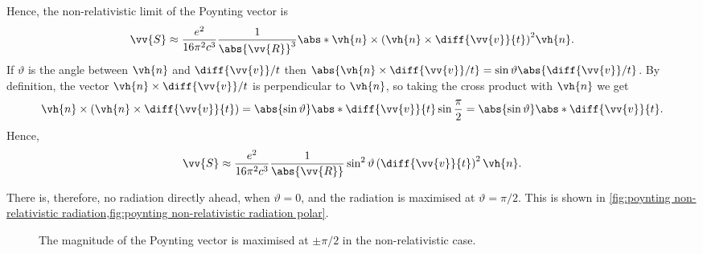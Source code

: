 \documentclass[fleqn]{NotesClass}
\begin{document}
    Hence, the non-relativistic limit of the Poynting vector is
    \begin{equation}
        \vv{S} \approx \frac{e^2}{16\pi^2c^3} \frac{1}{\abs{\vv{R}}^3} \abs*{\vh{n} \times \left( \vh{n} \times \diff{\vv{v}}{t} \right)}^2 \vh{n}.
    \end{equation}
    If \(\vartheta\) is the angle between \(\vh{n}\) and \(\diff{\vv{v}}/{t}\) then \(\abs{\vh{n} \times \diff{\vv{v}}/{t}} = \sin \vartheta \abs{\diff{\vv{v}}/{t}}\).
    By definition, the vector \(\vh{n} \times \diff{\vv{v}}/{t}\) is perpendicular to \(\vh{n}\), so taking the cross product with \(\vh{n}\) we get
    \begin{equation}
        \vh{n} \times \left( \vh{n} \times \diff{\vv{v}}{t} \right) = \abs{\sin\vartheta} \abs*{\diff{\vv{v}}{t}} \sin\frac{\pi}{2} = \abs{\sin\vartheta} \abs*{\diff{\vv{v}}{t}}.
    \end{equation}
    Hence,
    \begin{equation}
        \vv{S} \approx \frac{e^2}{16\pi^2 c^3} \frac{1}{\abs{\vv{R}}} \sin^2\vartheta \left( \diff{\vv{v}}{t} \right)^2 \vh{n}.
    \end{equation}
    
    There is, therefore, no radiation directly ahead, when \(\vartheta = 0\), and the radiation is maximised at \(\vartheta = \pi/2\).
    This is shown in \cref{fig:poynting non-relativistic radiation,fig:poynting non-relativistic radiation polar}.
    
    \begin{figure}
        \caption{The magnitude of the Poynting vector is maximised at \(\pm \pi/2\) in the non-relativistic case.}
        \label{fig:poynting non-relativistic radiation}
    \end{figure}
    
\end{document}
